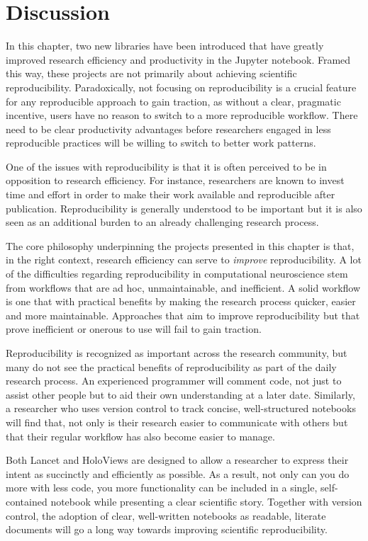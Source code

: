\documentclass[phd,ianc,twoside]{infthesis}
\begin{document}
\section{Discussion}

In this chapter, two new libraries have been introduced that have
greatly improved research efficiency and productivity in the Jupyter
notebook. Framed this way, these projects are not primarily about
achieving scientific reproducibility. Paradoxically, not focusing on
reproducibility is a crucial
feature for any reproducible approach to gain traction, as without a
clear, pragmatic incentive, users have no reason to switch to a more
reproducible workflow. There need to be clear productivity advantages
before researchers engaged in less reproducible practices will be
willing to switch to better work patterns.

One of the issues with reproducibility is that it is often perceived to
be in opposition to research efficiency. For instance, researchers are
known to invest time and effort in order to make their work available
and reproducible after publication. Reproducibility is generally
understood to be important but it is also seen as an additional burden
to an already challenging research process.

The core philosophy underpinning the projects presented in this chapter
is that, in the right context, research efficiency can serve to
\emph{improve} reproducibility. A lot of the difficulties regarding
reproducibility in computational neuroscience stem from workflows that
are ad hoc, unmaintainable, and inefficient. A solid workflow is one that
with practical benefits by making the research process quicker, easier
and more maintainable. Approaches that aim to improve reproducibility but
that prove inefficient or onerous to use will fail to gain traction.

Reproducibility is recognized as important across the research community,
but many do not see the practical benefits of reproducibility as part of
the daily research process. An experienced programmer will comment code,
not just to assist other people but to aid their own understanding at a
later date. Similarly, a researcher who uses version control to track
concise, well-structured notebooks will find that, not only is their
research easier to communicate with others but that their regular
workflow has also become easier to manage.

Both Lancet and HoloViews are designed to allow a researcher to express
their intent as succinctly and efficiently as possible. As a result, not
only can you do more with less code, you more functionality can be
included in a single, self-contained notebook while presenting a clear
scientific story. Together with version control, the adoption of clear,
well-written notebooks as readable, literate documents will go a long
way towards improving scientific reproducibility.
\end{document}
